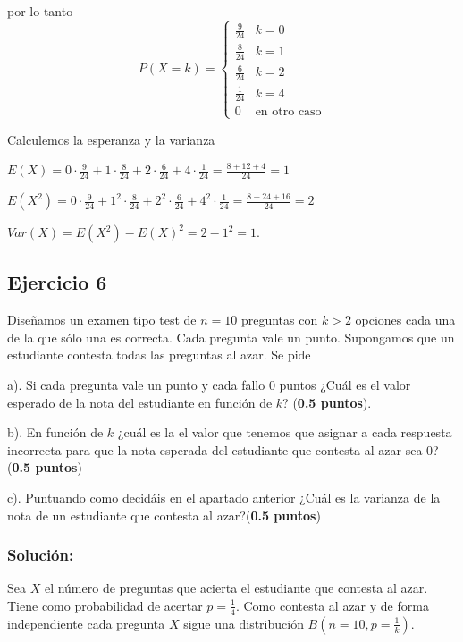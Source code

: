 \documentclass[
]{article}
\begin{document}
por lo tanto \[P(X=k)=\left\{
\begin{array}{lr}
\frac{9}{24} & k=0\\
\frac{8}{24} & k=1\\
\frac{6}{24} & k=2\\
\frac{1}{24} & k=4\\
0 & \mbox{en otro caso}
\end{array}
\right.
\]

Calculemos la esperanza y la varianza

\(E(X)= 0\cdot \frac{9}{24} +1\cdot \frac{8}{24} + 2 \cdot \frac{6}{24} + 4 \cdot \frac{1}{24} =\frac{8+12+4}{24}=1\)

\(E(X^2)= 0\cdot \frac{9}{24} +1^2\cdot \frac{8}{24} + 2^2 \cdot \frac{6}{24} + 4^2 \cdot \frac{1}{24} =\frac{8+24+16}{24}=2\)

\(Var(X)=E(X^2)-E(X)^2=2-1^2=1\).

\hypertarget{ejercicio-6}{%
\subsection{Ejercicio 6}\label{ejercicio-6}}

Diseñamos un examen tipo test de \(n=10\) preguntas con \(k>2\) opciones
cada una de la que sólo una es correcta. Cada pregunta vale un punto.
Supongamos que un estudiante contesta todas las preguntas al azar. Se
pide

a). Si cada pregunta vale un punto y cada fallo 0 puntos ¿Cuál es el
valor esperado de la nota del estudiante en función de \(k\)?
(\textbf{0.5 puntos}).

b). En función de \(k\) ¿cuál es la el valor que tenemos que asignar a
cada respuesta incorrecta para que la nota esperada del estudiante que
contesta al azar sea \(0\)? (\textbf{0.5 puntos})

c). Puntuando como decidáis en el apartado anterior ¿Cuál es la varianza
de la nota de un estudiante que contesta al azar?(\textbf{0.5 puntos})

\hypertarget{soluciuxf3n-5}{%
\subsubsection{Solución:}\label{soluciuxf3n-5}}

Sea \(X\) el número de preguntas que acierta el estudiante que contesta
al azar. Tiene como probabilidad de acertar \(p=\frac{1}{4}\). Como
contesta al azar y de forma independiente cada pregunta \(X\) sigue una
distribución \(B(n=10,p=\frac{1}{k})\).
\end{document}
